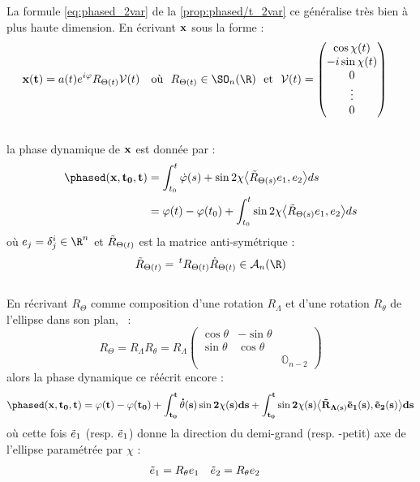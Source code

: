 \begin{proposition}\label{prop:phased_nvar}
	La formule \ref{eq:phased_2var} de la \cref{prop:phased/t_2var} ce généralise très bien à plus haute dimension. En écrivant $\bf{x}$ sous la forme :
	\begin{align}\label{eq:exp_elliptik_nvar}
		\bf{x}(t) &= a(t)e^{i\varphi} R_{\Theta(t)} \mathcal{V}(t)  &  \text{où }\ R_{\Theta(t)} \in\SO_n(\R)  \ \text{ et }\  \mathcal{V}(t) &= \begin{pmatrix} \cos\chi(t) \\ -i\sin\chi(t) \\ 0 \\ \vdots \\ 0 \end{pmatrix}
	\end{align}
	\\
	la phase dynamique de $\bf{x}$ est donnée par :
	\begin{equation}\label{eq:phased_nvar-v1}
		\begin{aligned}
			\phased(\bf{x}, t_0,t) &= \int_{t_0}^t \dot{\varphi}(s) + \sin2\chi \big\langle \Tilde{R}_{\Theta(s)} e_1, e_2\big\rangle ds \\
			&= \varphi(t) -\varphi(t_0) + \int_{t_0}^t \sin2\chi \big\langle \Tilde{R}_{\Theta(s)} e_1, e_2\big\rangle ds
		\end{aligned}
	\end{equation}
	où $e_j=\delta^i_j\in\R^n$ et $\Tilde{R}_{\Theta(t)}$ est la matrice anti-symétrique :
	\[\Tilde{R}_{\Theta(t)} =\, ^tR_{\Theta(t)} \dot{R}_{\Theta(t)}\in\mathcal{A}_n(\R)\]
	\\
	En récrivant $R_\Theta$ comme composition d'une rotation $R_\Lambda$ et d'une rotation $R_\theta$ de l'ellipse dans son plan, \ie~:
	\[R_\Theta = R_\Lambda R_\theta = R_\Lambda \begin{pmatrix}\cos\theta & -\sin\theta \\ \sin\theta & \cos\theta \\ & & \mathbb{O}_{n-2}
	\end{pmatrix}\]
	alors la phase dynamique ce réécrit encore :
	\begin{equation}\label{eq:phased_nvar-v2}
		\phased(\bf{x}, t_0,t) = \varphi(t) -\varphi(t_0) + \int_{t_0}^t \dot{\theta}(s) \sin2\chi(s) ds + \int_{t_0}^t \sin2\chi(s) \big\langle \Tilde{R}_{\Lambda(s)} \Tilde{e}_1(s),  \Tilde{e}_2(s)\big\rangle ds
	\end{equation}
	où cette fois $\Tilde{e}_1$ (resp. $\Tilde{e}_1$) donne la direction du demi-grand (resp. -petit) axe de l'ellipse paramétrée par $\chi$ :
	\begin{align*}
		 \Tilde{e}_1 &= R_\theta e_1  &   \Tilde{e}_2 &= R_\theta e_2
	\end{align*}
\end{proposition}

